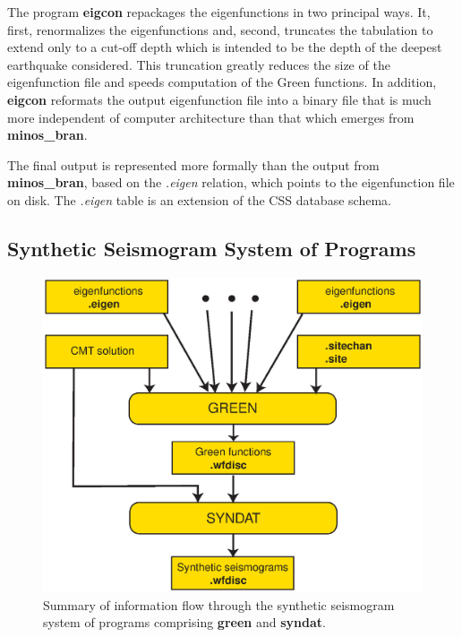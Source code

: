 \documentclass[11pt]{article}
\begin{document}
The program {\bf eigcon} repackages the eigenfunctions in two principal
ways. It, first, renormalizes the eigenfunctions and, second, truncates
the tabulation to extend only to a cut-off depth which is intended to be
the depth of the deepest earthquake considered. This truncation greatly
reduces the size of the eigenfunction file and speeds computation of the
Green functions. In addition, {\bf eigcon}
reformats the output eigenfunction file into a binary file that is
much more independent of computer architecture than that which emerges from
{\bf minos\_bran}.

The final output is represented more formally than the output from
{\bf minos\_bran}, based on the {\it .eigen} relation, which points
to the eigenfunction file on disk. The {\it .eigen} table is an extension of the CSS
database schema. 



\subsection{Synthetic Seismogram System of Programs}

\begin{figure}
\begin{center}
\includegraphics[width=5in]{Figures/Fig2}
\caption{Summary of information flow through the synthetic seismogram system of
programs comprising {\bf green} and {\bf syndat}.}
\label{fig:2}
\end{center}
\end{figure}
\end{document}
